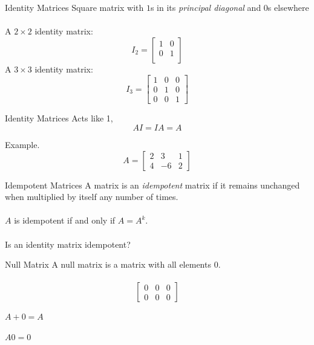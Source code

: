 \documentclass{./../../Latex/teaching_slides}
\begin{document}
\begin{frame}{Identity Matrices}
Square matrix with $1$s in its \textit{principal diagonal} and $0$s elsewhere \\~\\
A $2 \times 2$ identity matrix:
$$ I_2 = \begin{bmatrix}
1 & 0\\
0 & 1 \\
\end{bmatrix}$$
A $3 \times 3$ identity matrix:
$$ I_3 = \begin{bmatrix}
1 & 0 & 0 \\
0 & 1 & 0\\
0 & 0 & 1
\end{bmatrix}$$

\end{frame}

\begin{frame}{Identity Matrices}
Acts like 1, 
$$ AI = IA = A $$

\vspace{2em}

Example. 
$$A = \begin{bmatrix}
2 & 3 & 1 \\
4 & -6 & 2
\end{bmatrix}$$
\end{frame}

\begin{frame}{Idempotent Matrices}
A matrix is an \textit{idempotent} matrix if it remains unchanged when multiplied by itself any number of times. \\~\\
$A$ is idempotent if and only if $A = A^k$. \\~\\
Is an identity matrix idempotent?
\end{frame}

\begin{frame}{Null Matrix}
A null matrix is a matrix with all elements $0$. \\~\\
$$\begin{bmatrix}
0 & 0 & 0 \\
0 & 0 & 0
\end{bmatrix}$$
\begin{witemize}
\item $A + 0 = A$
\item $A 0 = 0$
\end{witemize}
\end{frame}
\end{document}
